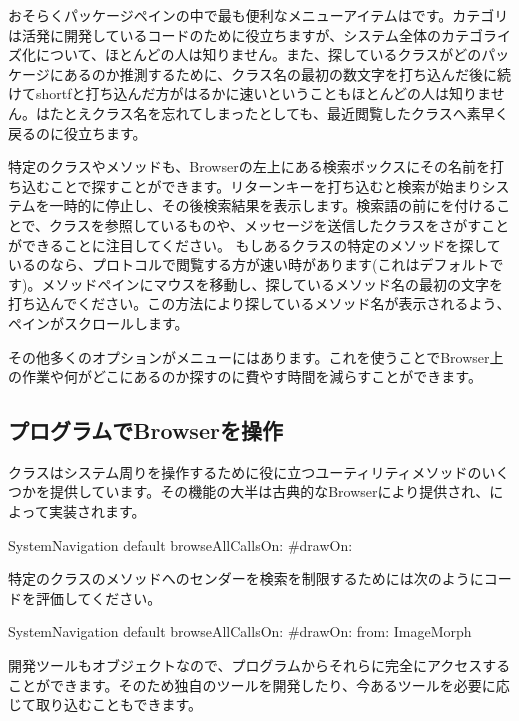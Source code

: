 \documentclass[a4paper,10pt,twoside]{book}
\begin{document}
おそらくパッケージペインの中で最も便利なメニューアイテムはです。カテゴリは活発に開発しているコードのために役立ちますが、システム全体のカテゴライズ化について、ほとんどの人は知りません。また、探しているクラスがどのパッケージにあるのか推測するために、クラス名の最初の数文字を打ち込んだ後に続けてshort{f}と打ち込んだ方がはるかに速いということもほとんどの人は知りません。はたとえクラス名を忘れてしまったとしても、最近閲覧したクラスへ素早く戻るのに役立ちます。

特定のクラスやメソッドも、Browserの左上にある検索ボックスにその名前を打ち込むことで探すことができます。リターンキーを打ち込むと検索が始まりシステムを一時的に停止し、その後検索結果を表示します。検索語の前に\ct{#}を付けることで、クラスを参照しているものや、メッセージを送信したクラスをさがすことができることに注目してください。
もしあるクラスの特定のメソッドを探しているのなら、プロトコルで閲覧する方が速い時があります(これはデフォルトです)。メソッドペインにマウスを移動し、探しているメソッド名の最初の文字を打ち込んでください。この方法により探しているメソッド名が表示されるよう、ペインがスクロールします。


その他多くのオプションがメニューにはあります。これを使うことでBrowser上の作業や何がどこにあるのか探すのに費やす時間を減らすことができます。


\subsection{プログラムでBrowserを操作}

クラスはシステム周りを操作するために役に立つユーティリティメソッドのいくつかを提供しています。その機能の大半は古典的なBrowserにより提供され、によって実装されます。

\begin{code}{}
SystemNavigation default browseAllCallsOn: #drawOn:
\end{code}
特定のクラスのメソッドへのセンダーを検索を制限するためには次のようにコードを評価してください。
\begin{code}{}
SystemNavigation default browseAllCallsOn: #drawOn: from: ImageMorph
\end{code}
開発ツールもオブジェクトなので、プログラムからそれらに完全にアクセスすることができます。そのため独自のツールを開発したり、今あるツールを必要に応じて取り込むこともできます。
\end{document}
